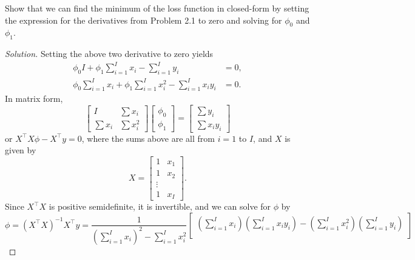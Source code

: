 \documentclass[10pt]{article}
\begin{document}
Show that we can find the minimum of the loss function in closed-form by setting the expression for the derivatives from Problem 2.1 to zero and solving for $\phi_0$ and $\phi_1$.

\begin{proof}[Solution]
    Setting the above two derivative to zero yields
    \begin{align*}
        \phi_0 I + \phi_1 \sum_{i=1}^I{x_i} - \sum_{i=1}^I{y_i} &= 0, \\
        \phi_0 \sum_{i=1}^I{x_i} + \phi_1 \sum_{i=1}^I{x_i^2} - \sum_{i=1}^I{x_iy_i} &= 0. 
    \end{align*}
    In matrix form, 
    \begin{equation*}
        \begin{bmatrix}
            I & \sum{x_i} \\
            \sum{x_i} & \sum{x_i^2}
        \end{bmatrix}
        \begin{bmatrix}
            \phi_0 \\
            \phi_1
        \end{bmatrix} = 
        \begin{bmatrix}
            \sum{y_i}  \\
            \sum{x_i y_i}
        \end{bmatrix}
    \end{equation*}
    or \(X^\top X \phi - X^\top y = 0\), where the sums above are all from \(i=1\) to \(I\), and \(X\) is given by
    \begin{equation*}
        X = \begin{bmatrix}
            1 & x_1 \\
            1 & x_2 \\
            \vdots \\
            1 & x_I
        \end{bmatrix}. 
    \end{equation*}
    Since \(X^\top X\) is positive semidefinite, it is invertible, and we can solve for \(\phi\) by 
    \begin{equation*}
        \phi = (X^\top X)^{-1} X^\top y = \frac{1}{\left( \sum\limits_{i=1}^I{x_i} \right)^2 - \sum\limits_{i=1}^I{x_i^2}} \begin{bmatrix}
            \left( \sum\limits_{i=1}^I{x_i} \right) \left(\sum\limits_{i=1}^I{x_i y_i} \right) - \left( \sum\limits_{i=1}^I{x_i^2} \right) \left( \sum\limits_{i=1}^I{y_i} \right) \\

\end{bmatrix}
\end{equation*}
\end{proof}
\end{document}
